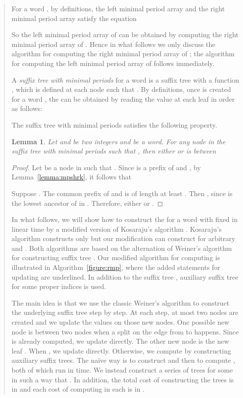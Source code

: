 \documentclass{article}
\newtheorem{lemma}[theorem]{Lemma}
\begin{document}
\begin{quote}
\begin{enumerate}
{{{{For a word , by definitions, the left minimal
period array and the right minimal period array satisfy the equation
  
So the left minimal period array of  can be obtained by computing
the right minimal period array of . Hence in what follows we only discuss the algorithm for computing
the right minimal period array of ; the algorithm for computing
the left minimal period array of  follows immediately.


A \emph{suffix tree with minimal periods}  for a
word  is a suffix tree  with a function , which
is defined at each node  such that .
By definitions, once  is created for a word
, the  can be obtained by reading the
value  at each leaf in order as follows:
  
The suffix tree with minimal periods satisfies the following
property.


\begin{lemma}\label{lemma:mpbond}
Let  and  be two integers and  be a word. For any
node  in the suffix tree with minimal periods 
such that , then either 
or  is between
  
\end{lemma}
\begin{proof}
Let  be a node in  such that
. Since  is a prefix of 
and , by Lemma~\ref{lemma:mpshrk}, it follows
that
  
Suppose . The common prefix of
 and
 is of length at least
. Then , since
 is the lowest ancestor of  in . Therefore,
either  or
.
\end{proof}


In what follows, we will show how to construct the 
for a word  with fixed  in linear time by a modified version
of Kosaraju's algorithm \cite{Kosaraju1994}. Kosaraju's algorithm
constructs only  but our modification can construct
 for arbitrary  and . Both
algorithms are based on the alternation of Weiner's algorithm
\cite{Weiner1973} for constructing suffix tree . Our
modified algorithm for computing  is illustrated in
Algorithm~\ref{figure:rmp}, where the added statements for updating
 are underlined. In addition to the suffix tree
, auxiliary suffix tree
 for some proper indices  is used.


The main idea is that we use the classic Weiner's algorithm to
construct the underlying suffix tree  step
by step. At each step, at most two nodes are created and we update
the  values on those new nodes. One possible new node  is
between two nodes  when a split on the edge from  to 
happens. Since  is already computed, we update
 directly. The other new node is the new leaf .
When , we update 
directly. Otherwise, we compute  by constructing
auxiliary suffix trees. The na\"ive way is to construct
 and then to compute
, both of which run in
 time. We instead construct a series
of trees  for some  in such a way that
. In addition, the
total cost of constructing the trees  is in  and each cost
of computing  in each  is
in .


}}}}
\end{enumerate}
\end{quote}
\end{document}

